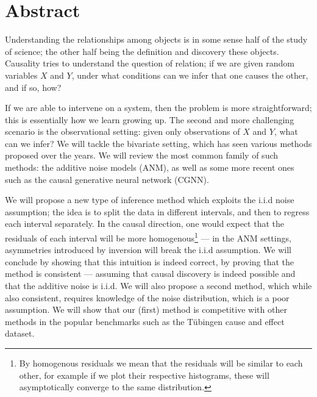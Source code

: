 

\cleardoublepage
\chapter*{Abstract}
\vspace{0.2\textheight}

Understanding the relationships among objects is in some sense half of the study of science; the other 
half being the definition and discovery these objects. Causality tries to understand the question of 
relation; if we are given random variables $X$ and $Y$, under what conditions can we infer that 
one causes the other, and if so, how? 


If we are able to intervene on a system, then the problem is more straightforward; this is essentially
how we learn growing up. The second and more challenging scenario is the observational setting: given 
only observations of $X$ and $Y$, what can we infer? We will tackle the bivariate setting, which has 
seen various methods proposed over the years. We will review the most common family of such methods: 
the additive noise models (ANM), as well as some more recent ones such as the causal generative neural 
network (CGNN). 

We will propose a new 
type of inference method which exploits the i.i.d 
noise assumption; the idea is to split the data in different intervals, and then to regress each 
interval separately. In the causal direction, one would expect that the residuals of each 
interval will be more homogenous\footnote{By homogenous residuals we mean that the residuals will 
be similar to each other, for example if we plot their respective histograms, these will asymptotically 
converge to the same distribution.} --- in the ANM settings, asymmetries introduced
by inversion will break the i.i.d assumption. We will conclude by 
showing that this intuition is indeed correct, by proving that the method is consistent --- 
assuming that causal discovery is indeed possible and that the additive noise is i.i.d. We will
also propose a second method, which while also consistent, requires knowledge of the 
noise distribution, which is a poor assumption. We will show that our (first) method is competitive with 
other methods in the popular benchmarks such as the Tübingen cause and effect dataset. 



